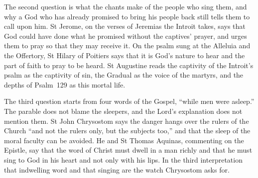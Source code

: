 The second question is what the chants make of the people who sing them, and
why a God who has already promised to bring his people back still tells them
to call upon him. St Jerome, on the verses of Jeremias the Introit takes, says
that God could have done what he promised without the captives' prayer, and
urges them to pray so that they may receive it. On the psalm sung at the
Alleluia and the Offertory, St Hilary of Poitiers says that it is God's nature
to hear and the part of faith to pray to be heard. St Augustine reads the
captivity of the Introit's psalm as the captivity of sin, the Gradual as the
voice of the martyrs, and the depths of Psalm~129 as this mortal life.

The third question starts from four words of the Gospel, ``while men were
asleep.'' The parable does not blame the sleepers, and the Lord's explanation
does not mention them. St John Chrysostom says the danger hangs over the
rulers of the Church ``and not the rulers only, but the subjects too,'' and
that the sleep of the moral faculty can be avoided. He and St Thomas Aquinas,
commenting on the Epistle, say that the word of Christ must dwell in a man
richly and that he must sing to God in his heart and not only with his lips.
In the third interpretation that indwelling word and that singing are the
watch Chrysostom asks for.

